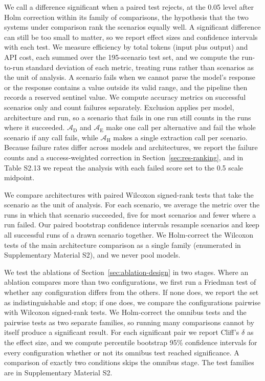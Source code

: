 \documentclass[final,3p,times]{elsarticle}
\begin{document}
We call a difference significant when a paired test rejects, at the 0.05 level after Holm correction within its family of comparisons, the hypothesis that the two systems under comparison rank the scenarios equally well. A significant difference can still be too small to matter, so we report effect sizes and confidence intervals with each test. We measure efficiency by total tokens (input plus output) and API cost, each summed over the 195-scenario test set, and we compute the run-to-run standard deviation of each metric, treating runs rather than scenarios as the unit of analysis. A scenario fails when we cannot parse the model's response or the response contains a value outside its valid range, and the pipeline then records a reserved sentinel value. We compute accuracy metrics on successful scenarios only and count failures separately. Exclusion applies per model, architecture and run, so a scenario that fails in one run still counts in the runs where it succeeded. $\mathcal{A}_{\text{D}}$ and $\mathcal{A}_{\text{E}}$ make one call per alternative and fail the whole scenario if any call fails, while $\mathcal{A}_{\text{H}}$ makes a single extraction call per scenario. Because failure rates differ across models and architectures, we report the failure counts and a success-weighted correction in Section~\ref{sec:res-ranking}, and in Table S2.13 we repeat the analysis with each failed score set to the 0.5 scale midpoint.

We compare architectures with paired Wilcoxon signed-rank tests that take the scenario as the unit of analysis. For each scenario, we average the metric over the runs in which that scenario succeeded, five for most scenarios and fewer where a run failed. Our paired bootstrap confidence intervals resample scenarios and keep all successful runs of a drawn scenario together. We Holm-correct the Wilcoxon tests of the main architecture comparison as a single family (enumerated in Supplementary Material S2), and we never pool models.

We test the ablations of Section~\ref{sec:ablation-design} in two stages. Where an ablation compares more than two configurations, we first run a Friedman test of whether any configuration differs from the others. If none does, we report the set as indistinguishable and stop; if one does, we compare the configurations pairwise with Wilcoxon signed-rank tests. We Holm-correct the omnibus tests and the pairwise tests as two separate families, so running many comparisons cannot by itself produce a significant result. For each significant pair we report Cliff's $\delta$ as the effect size, and we compute percentile bootstrap 95\% confidence intervals for every configuration whether or not its omnibus test reached significance. A comparison of exactly two conditions skips the omnibus stage. The test families are in Supplementary Material S2.
\end{document}
